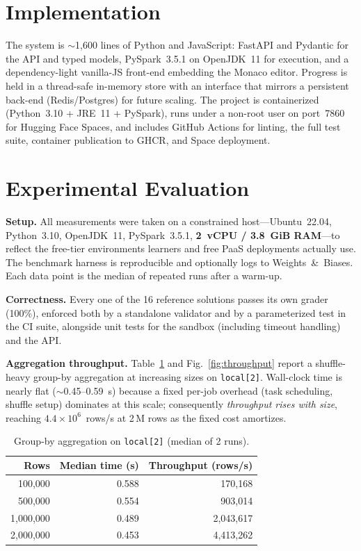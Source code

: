 \documentclass[10pt,twocolumn,letterpaper]{article}
\newcommand{\code}[1]{\texttt{\small #1}}
\begin{document}
\section{Implementation}
The system is $\sim$1{,}600 lines of Python and JavaScript: FastAPI and Pydantic for
the API and typed models, PySpark~3.5.1 on OpenJDK~11 for execution, and a
dependency-light vanilla-JS front-end embedding the Monaco editor. Progress is held
in a thread-safe in-memory store with an interface that mirrors a persistent
back-end (Redis/Postgres) for future scaling. The project is containerized
(Python~3.10 + JRE~11 + PySpark), runs under a non-root user on port~7860 for
Hugging Face Spaces, and includes GitHub Actions for linting, the full test suite,
container publication to GHCR, and Space deployment.

\section{Experimental Evaluation}
\label{sec:eval}
\textbf{Setup.} All measurements were taken on a constrained host---Ubuntu~22.04,
Python~3.10, OpenJDK~11, PySpark~3.5.1, \textbf{2~vCPU / 3.8~GiB RAM}---to reflect
the free-tier environments learners and free PaaS deployments actually use. The
benchmark harness is reproducible and optionally logs to Weights~\&~Biases. Each
data point is the median of repeated runs after a warm-up.

\textbf{Correctness.} Every one of the 16 reference solutions passes its own grader
(100\%), enforced both by a standalone validator and by a parameterized test in the
CI suite, alongside unit tests for the sandbox (including timeout handling) and the
API.

\textbf{Aggregation throughput.} Table~\ref{tab:throughput} and
Fig.~\ref{fig:throughput} report a shuffle-heavy group-by aggregation at increasing
sizes on \code{local[2]}. Wall-clock time is nearly flat ($\sim$0.45--0.59~s)
because a fixed per-job overhead (task scheduling, shuffle setup) dominates at this
scale; consequently \emph{throughput rises with size}, reaching
$4.4\times10^{6}$~rows/s at 2\,M rows as the fixed cost amortizes.

\begin{table}[t]
\centering
\caption{Group-by aggregation on \code{local[2]} (median of 2 runs).}
\label{tab:throughput}
\small
\begin{tabular}{@{}rrr@{}}
\toprule
\textbf{Rows} & \textbf{Median time (s)} & \textbf{Throughput (rows/s)} \\
\midrule
100{,}000   & 0.588 & 170{,}168 \\
500{,}000   & 0.554 & 903{,}014 \\
1{,}000{,}000 & 0.489 & 2{,}043{,}617 \\
2{,}000{,}000 & 0.453 & 4{,}413{,}262 \\
\bottomrule
\end{tabular}
\end{table}
\end{document}
